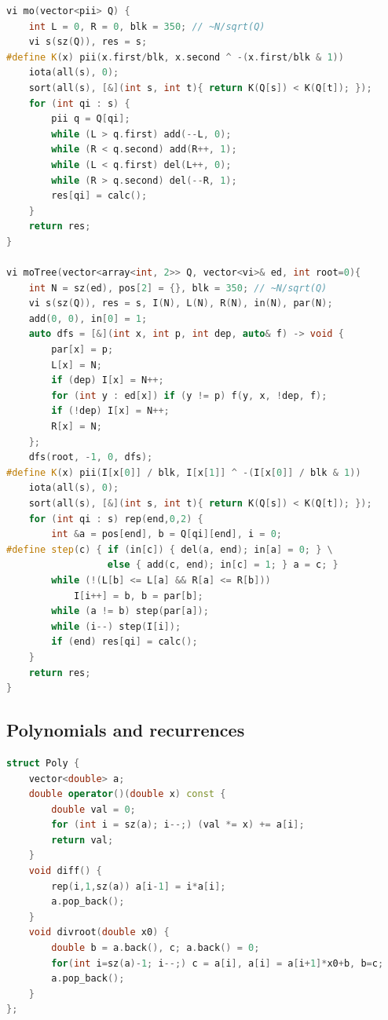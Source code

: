 \begin{multicols}{\Columns}
\begin{lstlisting}[language=C++]
vi mo(vector<pii> Q) {
	int L = 0, R = 0, blk = 350; // ~N/sqrt(Q)
	vi s(sz(Q)), res = s;
#define K(x) pii(x.first/blk, x.second ^ -(x.first/blk & 1))
	iota(all(s), 0);
	sort(all(s), [&](int s, int t){ return K(Q[s]) < K(Q[t]); });
	for (int qi : s) {
		pii q = Q[qi];
		while (L > q.first) add(--L, 0);
		while (R < q.second) add(R++, 1);
		while (L < q.first) del(L++, 0);
		while (R > q.second) del(--R, 1);
		res[qi] = calc();
	}
	return res;
}

vi moTree(vector<array<int, 2>> Q, vector<vi>& ed, int root=0){
	int N = sz(ed), pos[2] = {}, blk = 350; // ~N/sqrt(Q)
	vi s(sz(Q)), res = s, I(N), L(N), R(N), in(N), par(N);
	add(0, 0), in[0] = 1;
	auto dfs = [&](int x, int p, int dep, auto& f) -> void {
		par[x] = p;
		L[x] = N;
		if (dep) I[x] = N++;
		for (int y : ed[x]) if (y != p) f(y, x, !dep, f);
		if (!dep) I[x] = N++;
		R[x] = N;
	};
	dfs(root, -1, 0, dfs);
#define K(x) pii(I[x[0]] / blk, I[x[1]] ^ -(I[x[0]] / blk & 1))
	iota(all(s), 0);
	sort(all(s), [&](int s, int t){ return K(Q[s]) < K(Q[t]); });
	for (int qi : s) rep(end,0,2) {
		int &a = pos[end], b = Q[qi][end], i = 0;
#define step(c) { if (in[c]) { del(a, end); in[a] = 0; } \
                  else { add(c, end); in[c] = 1; } a = c; }
		while (!(L[b] <= L[a] && R[a] <= R[b]))
			I[i++] = b, b = par[b];
		while (a != b) step(par[a]);
		while (i--) step(I[i]);
		if (end) res[qi] = calc();
	}
	return res;
}
\end{lstlisting}




\subsection{Polynomials and recurrences}
\begin{lstlisting}[language=C++]
struct Poly {
	vector<double> a;
	double operator()(double x) const {
		double val = 0;
		for (int i = sz(a); i--;) (val *= x) += a[i];
		return val;
	}
	void diff() {
		rep(i,1,sz(a)) a[i-1] = i*a[i];
		a.pop_back();
	}
	void divroot(double x0) {
		double b = a.back(), c; a.back() = 0;
		for(int i=sz(a)-1; i--;) c = a[i], a[i] = a[i+1]*x0+b, b=c;
		a.pop_back();
	}
};
\end{lstlisting}


\end{multicols}
